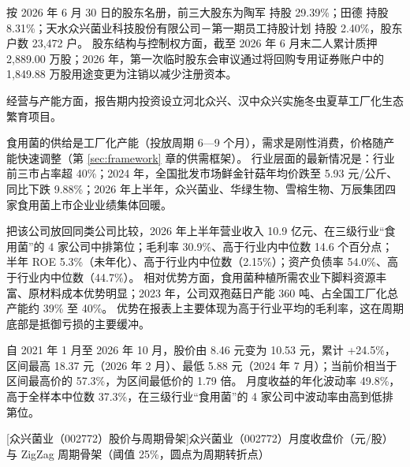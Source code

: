  按 2026 年 6 月 30 日的股东名册，前三大股东为陶军 持股 29.39\%；田德 持股 8.31\%；天水众兴菌业科技股份有限公司－第一期员工持股计划 持股 2.40\%，股东户数 23,472 户。 股东结构与控制权方面，截至 2026 年 6 月末二人累计质押 2,889.00 万股；2026 年，第一次临时股东会审议通过将回购专用证券账户中的 1,849.88 万股用途变更为注销以减少注册资本。

 经营与产能方面，报告期内投资设立河北众兴、汉中众兴实施冬虫夏草工厂化生态繁育项目。

 食用菌的供给是工厂化产能（投放周期 6---9 个月），需求是刚性消费，价格随产能快速调整（第 \ref{sec:framework} 章的供需框架）。 行业层面的最新情况是：行业前三市占率超 40\%；2024 年，全国批发市场鲜金针菇年均价跌至 5.93 元/公斤、同比下跌 9.88\%；2026 年上半年，众兴菌业、华绿生物、雪榕生物、万辰集团四家食用菌上市企业业绩集体回暖。

 把该公司放回同类公司比较，2026 年上半年营业收入 10.9 亿元、在三级行业“食用菌”的 4 家公司中排第位；毛利率 30.9\%、高于行业内中位数 14.6 个百分点；半年 ROE 5.3\%（未年化）、高于行业内中位数（2.15\%）；资产负债率 54.0\%、高于行业内中位数（44.7\%）。 相对优势方面，食用菌种植所需农业下脚料资源丰富、原材料成本优势明显；2023 年，公司双孢菇日产能 360 吨、占全国工厂化总产能约 39\% 至 40\%。 优势在报表上主要体现为高于行业平均的毛利率，这在周期底部是抵御亏损的主要缓冲。

 自 2021 年 1 月至 2026 年 10 月，股价由 8.46 元变为 10.53 元，累计 +24.5\%，区间最高 18.37 元（2026 年 2 月）、最低 5.88 元（2024 年 7 月）；当前价相当于区间最高价的 57.3\%，为区间最低价的 1.79 倍。 月度收益的年化波动率 49.8\%，高于全样本中位数 37.3\%，在三级行业“食用菌”的 4 家公司中波动率由高到低排第位。

\begin{center}
\begin{minipage}{\textwidth}\centering
{}

[众兴菌业（002772）股价与周期骨架]{众兴菌业（002772）月度收盘价（元/股）与 ZigZag 周期骨架（阈值 25\%，圆点为周期转折点）}
\end{minipage}
\end{center}

